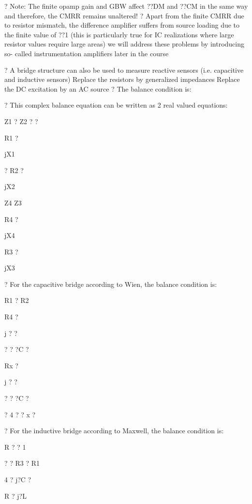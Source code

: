 \documentclass[2pt,landscape]{article}
\begin{document}
\begin{multicols*}{5}
?	Note: The finite opamp gain and GBW affect ??DM and ??CM in the same 
way and therefore, the CMRR remains unaltered!
?	Apart from the finite CMRR due to resistor mismatch, the difference 
amplifier suffers from source loading due to the finite value of ??1 (this is 
particularly true for IC realizations where large resistor values require 
large areas)	we will address these problems by introducing so- 
called instrumentation amplifiers later in the course



?	A bridge structure can also be used to measure reactive sensors (i.e. 
capacitive and inductive sensors)
\textbullet 	Replace the resistors by generalized impedances
\textbullet 	Replace the DC excitation by an AC source
?	The balance condition is:



?	This complex balance equation can be 
written as 2 real valued equations:



Z1 ? Z2 ?
? 


R1 ?


jX1


? R2 ?


jX2


Z4	Z3


R4 ?


jX4


R3 ?


jX3



?	For the capacitive bridge according to Wien, the balance condition is:

R1	?	R2



R4 ?


j ? ?


?
? ?C ?


Rx ?


j ? ?


?
? ?C ?


?	4 ?	?	x ?






?	For the inductive bridge according to Maxwell, the balance condition is:



R ? ? 1


? ?	R3 ? R1



4	?	j?C ?




R ? j?L



\end{multicols*}
\end{document}
